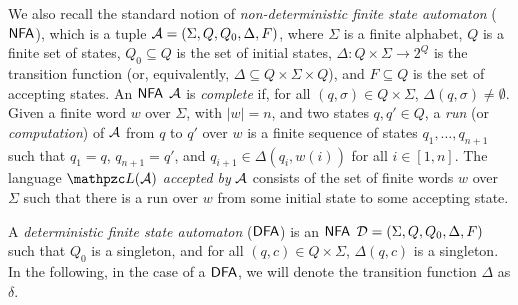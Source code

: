 We also recall the standard notion of
\emph{non-deterministic finite state automaton} ($\text{\sffamily NFA}$), which is a tuple 
$\mathcal{A} =(\Sigma,Q,Q_0,\Delta,F)$, where $\Sigma$ is a finite alphabet, $Q$ is a finite set of states, $Q_0\subseteq Q$ is the set of initial states,
$\Delta: Q\times \Sigma \to  2^Q$ is the transition function (or, equivalently, 
$\Delta\subseteq Q\times \Sigma \times Q$), and $F\subseteq Q$ is the set of 
accepting states. 
An $\text{\sffamily NFA}$ $\mathcal{A}$ is \emph{complete} if, for all $(q,\sigma)\in Q\times \Sigma$, $\Delta (q,\sigma)\neq \emptyset$.
Given a finite word $w$ over $\Sigma$, with $|w|=n$, and two states $q,q'\in 
Q$, a \emph{run} (or \emph{computation}) of $\mathcal{A}$ from $q$ to $q'$ over $w$ is 
a finite sequence of states $q_1,\ldots,q_{n+1}$ such that $q_1=q$, 
$q_{n+1}=q'$, and $q_{i+1} \in \Delta(q_i,w(i))$ for all $i\in [1,n]$. The 
language $\Lang(\Au)$  \emph{accepted by} $\mathcal{A}$ consists of the set of  finite 
words $w$ over $\Sigma$ such that there is a run over $w$ from some initial 
state to some accepting state.

A \emph{deterministic finite state automaton} ($\text{\sffamily DFA}$) is an $\text{\sffamily NFA}$ $\mathcal{D}=(\Sigma,Q,Q_0,\Delta,F)$ such that $Q_0$ is a singleton, and for all $(q,c)\in Q\times \Sigma$, $\Delta(q,c)$ is a singleton. In the following, in the case of a $\text{\sffamily DFA}$, we will denote the transition function $\Delta$ as $\delta$.

